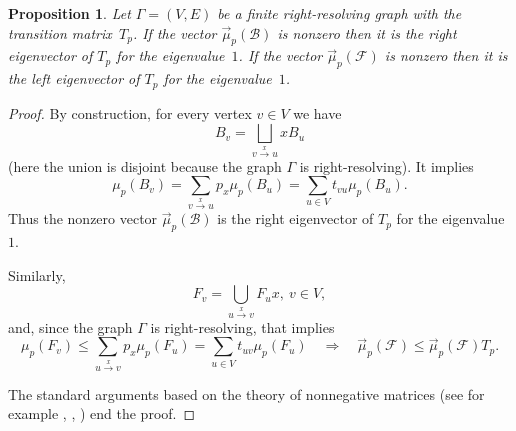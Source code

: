 \documentclass[12pt]{article}
\newcommand{\gr}{\Gamma}
\newcommand{\B}{\mathscr{B}}
\newcommand{\F}{\mathscr{F}}
\newtheorem{prop}[theor]{Proposition}
\theoremstyle{definition}
\begin{document}
\begin{prop}\label{prop_eigenvect_transition_matr}
Let $\gr=(V,E)$ be a finite right-resolving graph with the transition matrix~$T_p$. If the vector
$\vec \mu_p(\B)$ is nonzero then it is the right eigenvector of $T_p$ for the eigenvalue~$1$. If
the vector $\vec \mu_p(\F)$ is nonzero then it is the left eigenvector of $T_p$ for the
eigenvalue~$1$.
\end{prop}
\begin{proof}
By construction, for every vertex $v\in V$ we have
\[
B_v=\bigsqcup_{v\stackrel{x}\rightarrow u} xB_u
\]
(here the union is disjoint because the graph $\gr$ is right-resolving). It implies
\[
\mu_p(B_v)=\sum_{v\stackrel{x}\rightarrow u} p_x\mu_p(B_{u})=\sum_{u\in V} t_{vu}\mu_p(B_{u}).
\]
Thus the nonzero vector $\vec \mu_p(\B)$ is the right eigenvector of $T_p$ for the eigenvalue~$1$.

Similarly, %
\[
F_v=\bigcup_{u\stackrel{x}\rightarrow v} F_{u}x,\ v\in V,
\]
and, since the graph $\gr$ is right-resolving, that implies
\begin{equation*}%
\mu_p(F_v)\leq\sum_{u\stackrel{x}\rightarrow v} p_x\mu_p(F_{u})=\sum_{u\in V}
t_{uv}\mu_p(F_{u})\quad \Rightarrow\quad \vec \mu_p(\F)\leq\vec \mu_p(\F) T_p.
\end{equation*}

The standard arguments based on the theory of nonnegative matrices (see for example \cite[proof of
Theorem 4.5]{he_hui:self_affine}, \cite[p. 197]{gab_yu:natur_til}, \cite{handbook:rothblum}) end
the proof.
%
%
%
%
\end{proof}
\end{document}
